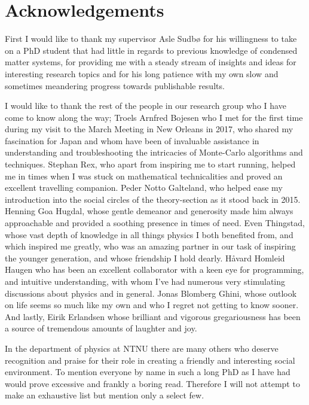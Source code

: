 \chapter*{Acknowledgements}\noindent

First I would like to thank my supervisor Asle Sudb{\o}  for his willingness to take on a PhD student
that had little in regards to previous knowledge of condensed matter systems, for providing me with a steady stream of insights
and ideas for interesting research topics and for his long patience with my own slow and sometimes meandering
progress towards publishable results. 

I would like to thank the rest of the people in our research group
who I have come to know along the way; Troels Arnfred Bojesen who I met for the first time during my
visit to the March Meeting in New Orleans in 2017, who shared my fascination for Japan and whom have been
of invaluable assistance in understanding and troubleshooting the intricacies of Monte-Carlo algorithms
and techniques. Stephan Rex, who apart from inspiring me to start running, helped me in times when I was
stuck on mathematical technicalities and proved an excellent travelling companion. Peder Notto Galteland, who
helped ease my introduction into the social circles of the theory-section as it stood back
in 2015. Henning Goa Hugdal, whose gentle
demeanor and generosity made him always approachable and provided a soothing presence in times of need.
Even Thingstad, whose vast depth of knowledge in all things physics I both benefited from, and which inspired
me greatly, who was an amazing partner in our task of inspiring the younger generation, and whose friendship I
hold dearly. Håvard Homleid Haugen who has been an excellent collaborator with a keen eye for programming,
and intuitive understanding, with whom I've had numerous very stimulating discussions about physics and in general.
Jonas Blomberg Ghini, whose outlook on life seems so much like my own and who I regret not getting to know sooner.
And lastly, Eirik Erlandsen
whose brilliant and vigorous gregariousness has been a source of tremendous amounts of laughter and joy.

In the department of physics at NTNU there are many others who deserve recognition and praise for their role in creating
a friendly and interesting social environment. To mention everyone by name in such a long PhD as I have had would
prove excessive and frankly a boring read. Therefore I will not attempt to make an exhaustive list but mention
only a select few. 

